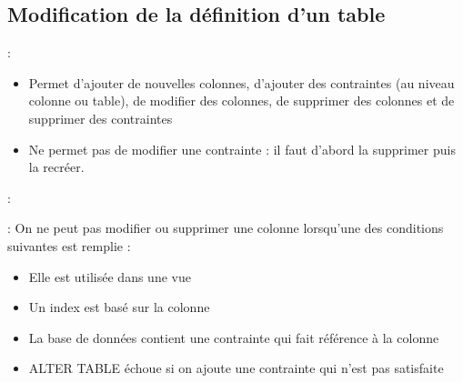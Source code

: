 \documentclass[10pt]{beamer}
\begin{document}
\subsection{Modification de la définition d'un table}
\begin{frame}{\secname : \subsecname}
    \begin{itemize}
        \item Permet d'ajouter de nouvelles colonnes, d'ajouter des contraintes (au niveau colonne ou table), de modifier des colonnes, de supprimer des colonnes et de supprimer des contraintes
        \item Ne permet pas de modifier une contrainte : il faut d'abord la supprimer puis la recréer.
    \end{itemize}
\end{frame}

\begin{frame}{\secname : \subsecname}
    
\end{frame}

\begin{frame}{\secname : \subsecname}
    On ne peut pas modifier ou supprimer une colonne lorsqu'une des conditions suivantes est remplie :
    \begin{itemize}
        \item Elle est utilisée dans une vue
        \item Un index est basé sur la colonne
        \item La base de données contient une contrainte qui fait référence à la colonne
        \item ALTER TABLE échoue si on ajoute une contrainte qui n'est pas satisfaite
    \end{itemize}
\end{frame}


\end{document}
